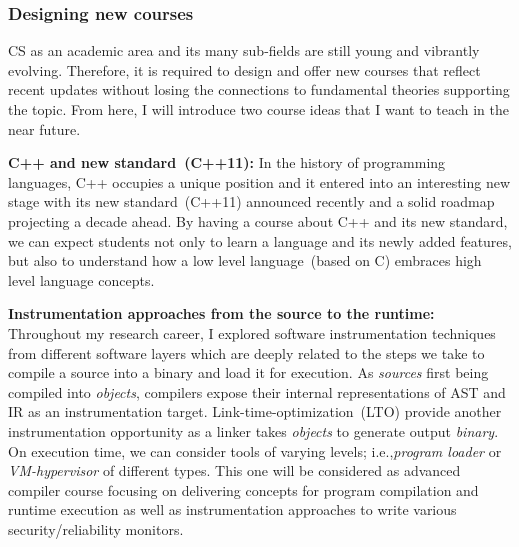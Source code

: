 \documentclass[letterpaper, 10pt]{article}
\def\ie{i.e.,\xspace}
\begin{document}
\begin{small}
\subsubsection*{Designing new courses} 

CS as an academic area and its many sub-fields are still young and vibrantly
evolving. Therefore, it is required to design and offer new courses that
reflect recent updates without losing the connections to fundamental theories
supporting the topic. From here, I will introduce two course ideas that I want
to teach in the near future. 

{\bf C++ and new standard~(C++11):} In the history of programming languages,
C++ occupies a unique position and it entered into an interesting new stage
with its new standard~(C++11) announced recently and a solid roadmap projecting
a decade ahead.
%
%
By having a course about C++ and its new standard, we can expect students not
only to learn a language and its newly added features, but also to understand
how a low level language~(based on C) embraces high level language concepts. 

{\bf Instrumentation approaches from the source to the runtime:} 
Throughout my research career, I explored software instrumentation techniques
from different software layers which are deeply related to the steps we take to
compile a source into a binary and load it for execution. 
%
As {\it sources} first being compiled into {\it objects}, compilers expose their 
internal representations of AST and IR as an instrumentation target.
%
Link-time-optimization~(LTO) provide another instrumentation opportunity as a
linker takes {\it objects} to generate output {\it binary}. 
%
On execution time, we can consider tools of varying levels; \ie {\it program
loader} or {\it VM-hypervisor} of different types.
%
This one will be considered as  advanced compiler course focusing on delivering
concepts for program compilation and runtime execution as well as
instrumentation approaches to write various security/reliability monitors.


\end{small}
\end{document}
